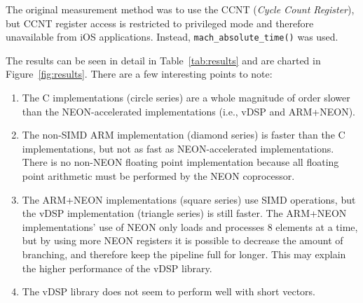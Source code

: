 \documentclass[oneside,a4paper]{report}
\begin{document}
The original measurement method was to use the CCNT (\emph{Cycle Count Register}), but CCNT register access is restricted to privileged mode and therefore unavailable from iOS applications. Instead, \texttt{mach\_absolute\_time()} was used.

The results can be seen in detail in Table~\ref{tab:results} and are charted in Figure~\ref{fig:results}. There are a few interesting points to note:
\begin{enumerate}
	\item The C implementations (circle series) are a whole magnitude of order slower than the NEON-accelerated implementations (i.e., vDSP and ARM+NEON).
	\item The non-SIMD ARM implementation (diamond series) is faster than the C implementations, but not as fast as NEON-accelerated implementations. There is no non-NEON floating point implementation because all floating point arithmetic must be performed by the NEON coprocessor.
	\item The ARM+NEON implementations (square series) use SIMD operations, but the vDSP implementation (triangle series) is still faster. The ARM+NEON implementations' use of NEON only loads and processes 8 elements at a time, but by using more NEON registers it is possible to decrease the amount of branching, and therefore keep the pipeline full for longer. This may explain the higher performance of the vDSP library.
	\item The vDSP library does not seem to perform well with short vectors.
\end{enumerate}
\end{document}
